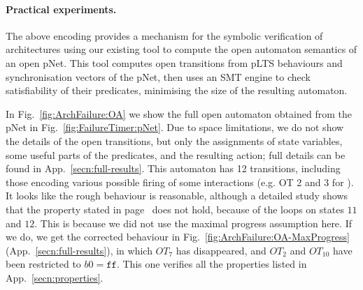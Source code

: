 \documentclass{llncs}
\newcommand{\Simon}{\\\hfill\mdash Simon}
\newcommand{\noteSB}[2][color=green!40, size=\tiny]{\todo[#1]{{#2}\Simon}}
\newcommand{\Ludo}{\\\hfill\mdash Ludo}
\newcommand{\noteLH}[2][color=orange!40, size=\tiny]{\todo[#1]{{#2}\Ludo}}
\newcommand{\todoEM}[2][color=blue!40, size=\tiny]{\todo[#1]{\textbf{To-do Eric:} {#2}}}
\newcommand{\fig}[1]{Fig.~\ref{fig:#1}}
\newcommand{\ex}[1]{Ex.~\ref{ex:#1}}
\newcommand{\app}[1]{App.~\ref{secn:#1}}
\newcommand{\mdash}[1][]{---#1}
\newcommand{\false}{\ensuremath{\mathtt{f\!f}}}
\begin{document}
\paragraph{Practical experiments.}%
The above encoding provides a mechanism for the symbolic verification
of architectures using our existing tool
\cite{HMZ-FORTE2016QBMZ-AVOCS18} to compute the open automaton
semantics of an open pNet. This tool computes open transitions from
pLTS behaviours and synchronisation vectors of the pNet, then uses an
SMT engine to check satisfiability of their predicates, minimising the
size of the resulting automaton.

In \fig{ArchFailure:OA} we show the full open automaton
obtained from the pNet in \fig{FailureTimer:pNet}.  Due to space limitations, we do not show the
details of the open transitions, but only the assignments of state
variables, some useful parts of the predicates, and the resulting
action; full details can be found in 
\app{full-results}.
%
This automaton has 12 transitions, including those encoding various
possible firing of some interactions (e.g. OT 2 and 3 for
{\PortFail}). It looks like the rough behaviour is
reasonable, although a detailed study shows that the property stated
in page~\pageref{property:reset} does not hold, because of the
{\PortFail} loops on states $11$ and $12$. This is because we did not
use the maximal progress assumption here. If we do, we get the
corrected behaviour in \fig{ArchFailure:OA-MaxProgress}
(\app{full-results}), in which $OT_7$ has disappeared, and $OT_2$ and
$OT_{10}$ have been restricted to $b0=\false$. This one verifies all
the properties listed in \app{properties}.
\end{document}
